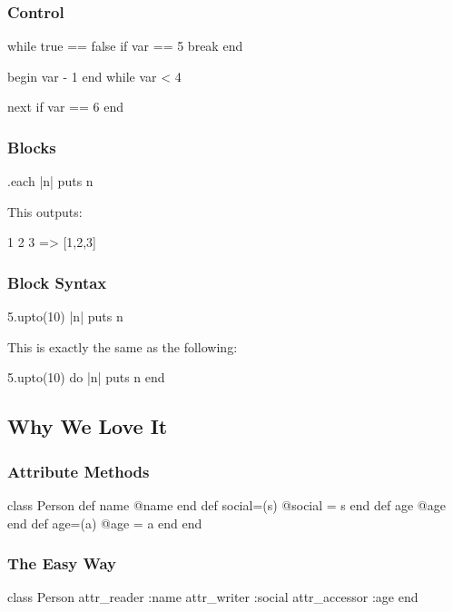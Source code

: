 \begin{frame}[fragile]
  \frametitle{Control}
  \begin{rubycode}
    while true == false
      if var == 5
        break
      end

      begin
        var - 1
      end while var < 4

      next if var == 6
    end
  \end{rubycode}
\end{frame}

\begin{frame}[fragile]
  \frametitle{Blocks}
  \begin{rubycode}
    [1,2,3].each { |n| puts n }
  \end{rubycode}
  \pause
  This outputs:
  \begin{console}
    1
    2
    3
    => [1,2,3]
  \end{console}
\end{frame}

\begin{frame}[fragile]
  \frametitle{Block Syntax}
  \begin{rubycode}
    5.upto(10) { |n| puts n }
  \end{rubycode}

  This is exactly the same as the following:

  \begin{rubycode}
    5.upto(10) do |n|
      puts n
    end
  \end{rubycode}
\end{frame}

\subsection{Why We Love It}

\begin{frame}[fragile]
  \frametitle{Attribute Methods}
  \begin{rubycode}
    class Person
      def name
        @name
      end
      def social=(s)
        @social = s
      end
      def age
        @age
      end
      def age=(a)
        @age = a
      end
    end
  \end{rubycode}
\end{frame}

\begin{frame}[fragile]
  \frametitle{The Easy Way}
  \begin{rubycode}
    class Person
      attr_reader :name
      attr_writer :social
      attr_accessor :age
    end
  \end{rubycode}
\end{frame}

